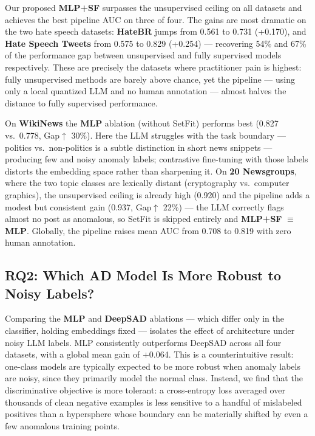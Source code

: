 \documentclass[12pt]{article}
\begin{document}
Our proposed \textbf{MLP+SF} surpasses the unsupervised ceiling on all datasets
and achieves the best pipeline AUC on three of four. The gains are most dramatic
on the two hate speech datasets: \textbf{HateBR} jumps from 0.561 to 0.731
(+0.170), and \textbf{Hate Speech Tweets} from 0.575 to 0.829 (+0.254) ---
recovering 54\% and 67\% of the performance gap between unsupervised and fully
supervised models respectively. These are precisely the datasets where practitioner
pain is highest: fully unsupervised methods are barely above chance,
yet the pipeline --- using only a local quantized LLM and no human annotation
--- almost halves the distance to fully supervised performance.

On \textbf{WikiNews} the \textbf{MLP} ablation (without SetFit) performs best
(0.827 vs.\ 0.778, Gap$\uparrow$ 30\%). Here the LLM struggles with the
task boundary --- politics vs.\ non-politics is a subtle distinction in short
news snippets --- producing few and noisy anomaly labels; contrastive
fine-tuning with those labels distorts the embedding space rather than
sharpening it. On \textbf{20 Newsgroups}, where the two topic classes are
lexically distant (cryptography vs.\ computer graphics), the unsupervised
ceiling is already high (0.920) and the pipeline adds a modest but consistent
gain (0.937, Gap$\uparrow$ 22\%) --- the LLM correctly flags almost no post
as anomalous, so SetFit is skipped entirely and \textbf{MLP+SF}
$\equiv$ \textbf{MLP}. Globally, the pipeline raises mean AUC from 0.708
to 0.819 with zero human annotation.

\subsection{RQ2: Which AD Model Is More Robust to Noisy Labels?}

Comparing the \textbf{MLP} and \textbf{DeepSAD} ablations --- which differ 
only in the classifier, holding embeddings fixed --- isolates the effect of 
architecture under noisy LLM labels. MLP consistently outperforms DeepSAD 
across all four datasets, with a global mean gain of $+$0.064. This is a 
counterintuitive result: one-class models are typically expected to be more 
robust when anomaly labels are noisy, since they primarily model the normal 
class. Instead, we find that the discriminative objective is more tolerant: 
a cross-entropy loss averaged over thousands of clean negative examples is 
less sensitive to a handful of mislabeled positives than a hypersphere whose 
boundary can be materially shifted by even a few anomalous training points.
\end{document}
